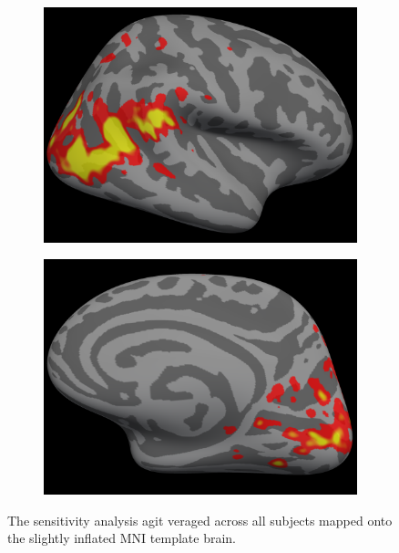 \documentclass[preprint,5p,authoryear]{elsarticle}
\begin{document}
\begin{figure}
\begin{subfigure}{0.4\textwidth}
\caption{}
\label{fig:lh-medial-smax-average}
\end{subfigure}
\begin{subfigure}{0.4\textwidth}
\centering
\includegraphics[width=\textwidth]{figures/rh-lateral-smax-average}
\caption{}
\label{fig:rh-lateral-smax-average}
\end{subfigure}
\begin{subfigure}{0.4\textwidth}
\centering
\includegraphics[width=\textwidth]{figures/rh-medial-smax-average}
\caption{}
\label{fig:rh-medial-smax-average}
\end{subfigure}
\caption{The sensitivity analysis agit veraged across all subjects mapped onto the slightly inflated MNI template brain.}
\label{fig:MNI-average-sensitivity}
\end{figure}
\end{document}
